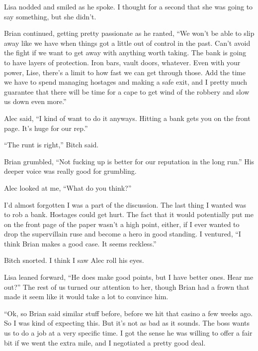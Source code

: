 Lisa nodded and smiled as he spoke.  I thought for a second that she was going to say something, but she didn't.



Brian continued, getting pretty passionate as he ranted, ``We won't be able to slip away like we have when things got a little out of control in the past.  Can't avoid the fight if we want to get away with anything worth taking.  The bank is going to have layers of protection.  Iron bars, vault doors, whatever.  Even with your power, Lise, there's a limit to how fast we can get through those.  Add the time we have to spend managing hostages and making a safe exit, and I pretty much guarantee that there will be time for a cape to get wind of the robbery and slow us down even more.''



Alec said, ``I kind of want to do it anyways.  Hitting a bank gets you on the front page.  It's huge for our rep.''



``The runt is right,'' Bitch said.



Brian grumbled, ``Not fucking up is better for our reputation in the long run.''  His deeper voice was really good for grumbling.



Alec looked at me, ``What do you think?''



I'd almost forgotten I was a part of the discussion.  The last thing I wanted was to rob a bank.  Hostages could get hurt.  The fact that it would potentially put me on the front page of the paper wasn't a high point, either, if I ever wanted to drop the supervillain ruse and become a hero in good standing.  I ventured, ``I think Brian makes a good case.  It seems reckless.''



Bitch snorted.  I think I saw Alec roll his eyes.



Lisa leaned forward, ``He does make good points, but I have better ones.  Hear me out?''  The rest of us turned our attention to her, though Brian had a frown that made it seem like it would take a lot to convince him.



``Ok, so Brian said similar stuff before, before we hit that casino a few weeks ago.  So I was kind of expecting this.  But it's not as bad as it sounds.  The boss wants us to do a job at a very specific time.  I got the sense he was willing to offer a fair bit if we went the extra mile, and I negotiated a pretty good deal.



